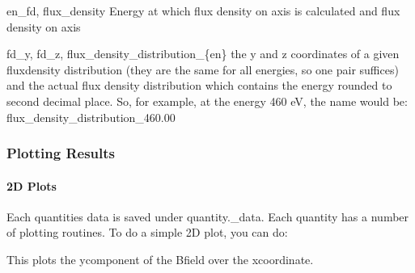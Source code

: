 \documentclass[letterpaper,10pt,english]{sphinxmanual}
\begin{document}
\begin{DUlineblock}{0em}
\item[] en\_fd, flux\_density \sphinxhyphen{} Energy at which flux density on axis is calculated and flux density on axis
\end{DUlineblock}

\begin{DUlineblock}{0em}
\item[] fd\_y, fd\_z, flux\_density\_distribution\_\{en\} \sphinxhyphen{} the y and z coordinates of a given flux\sphinxhyphen{}density distribution (they are the same for all energies, so one pair suffices) and the actual flux density distribution \sphinxhyphen{} which contains the energy rounded to second decimal place. So, for example, at the energy 460 eV, the name would be: flux\_density\_distribution\_460.00
\end{DUlineblock}


\subsubsection{Plotting Results}
\label{\detokenize{quickguide:plotting-results}}

\paragraph{2D Plots}
\label{\detokenize{quickguide:d-plots}}
\sphinxAtStartPar
Each quantities data is saved under quantity.\_data. Each quantity has a number of plotting routines. To do a simple 2D plot, you can do:

\begin{sphinxVerbatim}[commandchars=\\\{\},numbers=left,firstnumber=1,stepnumber=1]
   
  
  
\end{sphinxVerbatim}

\sphinxAtStartPar
This plots the y\sphinxhyphen{}component of the B\sphinxhyphen{}field over the x\sphinxhyphen{}coordinate.
\end{document}
